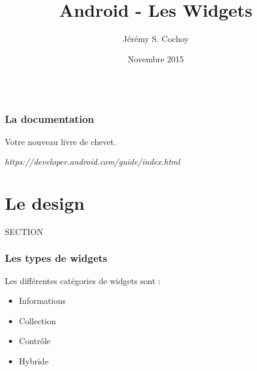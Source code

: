 \documentclass{beamer}
\begin{document}
\title{Android - Les Widgets}
\author{Jérémy S. Cochoy}
\date{Novembre 2015}


\begin{frame}
\titlepage
\end{frame}

\begin{frame}
  \begin{columns}[t]
  \begin{column}{5cm}
  \tableofcontents[sections={1-3}]
  \end{column}
  \begin{column}{5cm}
  \tableofcontents[sections={4-8}]
  \end{column}
  \end{columns}
\end{frame}

\begin{frame}
\frametitle{La documentation}

\begin{block}{Votre nouveau livre de chevet.}
\begin{center}
\emph{https://developer.android.com/guide/index.html}
\end{center}
\end{block}

\end{frame}

\section{Le design}

\begin{frame}
SECTION
\end{frame}

\begin{frame}
\frametitle{Les types de widgets}
\begin{block}{Les différentes catégories de widgets sont :}
\begin{itemize}
\item Informations
\item Collection
\item Contrôle
\item Hybride
\end{itemize}
\end{block}
\end{frame}
\end{document}
